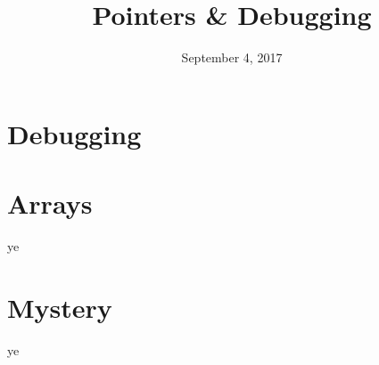 \documentclass[11pt]{exam}
\title{Pointers \& Debugging}
\date{September 4, 2017}
\begin{document}
\maketitle

\section{Debugging}

\section{Arrays}
\begin{questions}
\item ye
\end{questions}

\section{Mystery}
\begin{questions}
\item ye
\end{questions}
\end{document}
